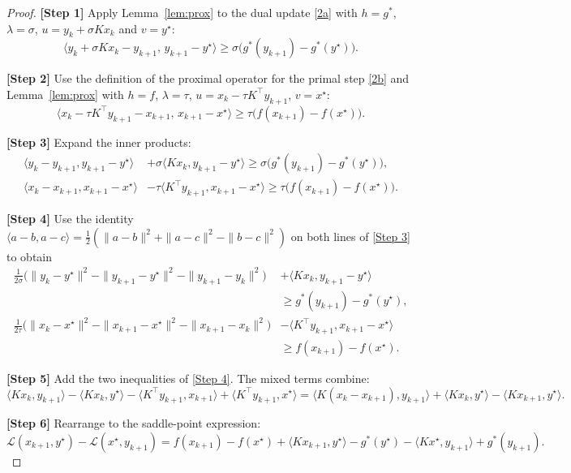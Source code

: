 \documentclass{article}
\begin{document}
\begin{proof}
\textbf{[Step 1]} Apply Lemma~\ref{lem:prox} to the dual update \eqref{2a} with $h=g^{*}$, $\lambda=\sigma$, $u=y_{k}+\sigma Kx_{k}$ and $v=y^{\star}$:
\[
\langle y_{k}+\sigma Kx_{k}-y_{k+1},\,y_{k+1}-y^{\star}\rangle
\ge\sigma\bigl(g^{*}(y_{k+1})-g^{*}(y^{\star})\bigr).
\tag{Step 1}
\]

\textbf{[Step 2]} Use the definition of the proximal operator for the primal step \eqref{2b} and Lemma~\ref{lem:prox} with $h=f$, $\lambda=\tau$, $u=x_{k}-\tau K^{\top}y_{k+1}$, $v=x^{\star}$:
\[
\langle x_{k}-\tau K^{\top}y_{k+1}-x_{k+1},\,x_{k+1}-x^{\star}\rangle
\ge\tau\bigl(f(x_{k+1})-f(x^{\star})\bigr).
\tag{Step 2}
\]

\textbf{[Step 3]} Expand the inner products:
\[
\begin{aligned}
\langle y_{k}-y_{k+1},y_{k+1}-y^{\star}\rangle
&+\sigma\langle Kx_{k},y_{k+1}-y^{\star}\rangle
\ge\sigma\bigl(g^{*}(y_{k+1})-g^{*}(y^{\star})\bigr),\\[1mm]
\langle x_{k}-x_{k+1},x_{k+1}-x^{\star}\rangle
&-\tau\langle K^{\top}y_{k+1},x_{k+1}-x^{\star}\rangle
\ge\tau\bigl(f(x_{k+1})-f(x^{\star})\bigr).
\end{aligned}
\tag{Step 3}
\]

\textbf{[Step 4]} Use the identity $\langle a-b,a-c\rangle=\frac12(\|a-b\|^{2}+\|a-c\|^{2}-\|b-c\|^{2})$ on both lines of \eqref{Step 3} to obtain
\[
\begin{aligned}
\frac{1}{2\sigma}\bigl(\|y_{k}-y^{\star}\|^{2}-\|y_{k+1}-y^{\star}\|^{2}
-\|y_{k+1}-y_{k}\|^{2}\bigr)
&+\langle Kx_{k},y_{k+1}-y^{\star}\rangle \\
&\ge g^{*}(y_{k+1})-g^{*}(y^{\star}),\\[1mm]
\frac{1}{2\tau}\bigl(\|x_{k}-x^{\star}\|^{2}-\|x_{k+1}-x^{\star}\|^{2}
-\|x_{k+1}-x_{k}\|^{2}\bigr)
&-\langle K^{\top}y_{k+1},x_{k+1}-x^{\star}\rangle \\
&\ge f(x_{k+1})-f(x^{\star}).
\end{aligned}
\tag{Step 4}
\]

\textbf{[Step 5]} Add the two inequalities of \eqref{Step 4}. The mixed terms combine:
\[
\langle Kx_{k},y_{k+1}\rangle-\langle Kx_{k},y^{\star}\rangle
-\langle K^{\top}y_{k+1},x_{k+1}\rangle+\langle K^{\top}y_{k+1},x^{\star}\rangle
=
\langle K(x_{k}-x_{k+1}),y_{k+1}\rangle
+\langle Kx_{k},y^{\star}\rangle-\langle Kx_{k+1},y^{\star}\rangle .
\tag{Step 5}
\]

\textbf{[Step 6]} Rearrange to the saddle‑point expression:
\[
\mathcal L(x_{k+1},y^{\star})-\mathcal L(x^{\star},y_{k+1})
=
f(x_{k+1})-f(x^{\star})+\langle Kx_{k+1},y^{\star}\rangle-g^{*}(y^{\star})
-\langle Kx^{\star},y_{k+1}\rangle+g^{*}(y_{k+1}).
\tag{Step 6}
\]


\end{proof}
\end{document}
